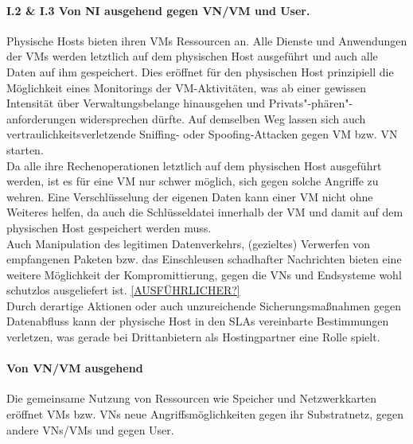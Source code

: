\paragraph{I.2 \& I.3 Von NI ausgehend gegen VN/VM und User.}
\label{parag:vonNI}
Physische Hosts bieten ihren VMs Ressourcen an. Alle Dienste und Anwendungen der VMs werden letztlich auf dem physischen Host ausgeführt und auch alle Daten auf ihm gespeichert. Dies eröffnet für den physischen Host prinzipiell die Möglichkeit eines Monitorings der VM-Aktivitäten, was ab einer gewissen Intensität über Verwaltungsbelange hinausgehen und Privats"-phären"-anforderungen widersprechen dürfte. Auf demselben Weg lassen sich auch vertraulichkeitsverletzende Sniffing- oder Spoofing-Attacken gegen VM bzw. VN starten. \\
Da alle ihre Rechenoperationen letztlich auf dem physischen Host ausgeführt werden, ist es für eine VM nur schwer möglich, sich gegen solche Angriffe zu wehren. Eine Verschlüsselung der eigenen Daten kann einer VM nicht ohne Weiteres helfen, da auch die Schlüsseldatei innerhalb der VM und damit auf dem physischen Host gespeichert werden muss.\\
Auch Manipulation des legitimen Datenverkehrs, (gezieltes) Verwerfen von empfangenen Paketen bzw. das Einschleusen schadhafter Nachrichten bieten eine weitere Möglichkeit der Kompromittierung, gegen die VNs und Endsysteme wohl schutzlos ausgeliefert ist.
\underline{[AUSFÜHRLICHER?]}\\
Durch derartige Aktionen oder auch unzureichende Sicherungsmaßnahmen gegen Datenabfluss kann der physische Host in den SLAs vereinbarte Bestimmungen verletzen, was gerade bei Drittanbietern als Hostingpartner eine Rolle spielt.



\paragraph{Von VN/VM ausgehend}
\label{parag:vonVN}
Die gemeinsame Nutzung von Ressourcen wie Speicher und Netzwerkkarten eröffnet VMs bzw. VNs neue Angriffsmöglichkeiten gegen ihr Substratnetz, gegen andere VNs/VMs und gegen User.


